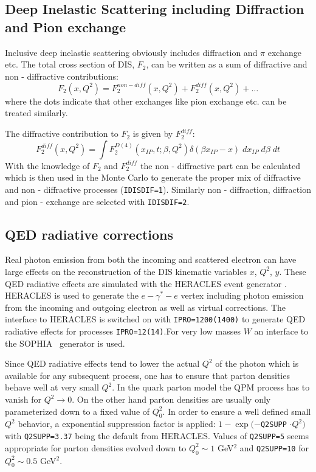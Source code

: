 \documentclass[10pt]{article} \usepackage{dina4}
\newcommand{\pom}{I\!\!P}
\newcommand{\xpom}{x_{\pom}}
\begin{document}
\subsection{Deep Inelastic Scattering including Diffraction and Pion exchange}
Inclusive deep inelastic scattering obviously includes diffraction and 
$\pi$ exchange etc. The total cross section of DIS, $F_2$, can be 
written as a sum of diffractive and non - diffractive contributions:
\begin{equation}
F_2(x,Q^2) = F_2^{non - diff}(x,Q^2) + F_2^{diff}(x,Q^2) + \ldots
\end{equation}
where the dots indicate that other exchanges like pion exchange etc. can
be treated similarly.
\par
The diffractive contribution to $F_2$ is given by $F_2^{diff}$:
\begin{equation}
F_2^{diff}(x,Q^2) =\int F_2^{D(4)}(\xpom,t;\beta,Q^2)
      \delta(\beta\xpom - x)\; d\xpom \;d\beta\;dt
\end{equation}
With the knowledge of $F_2$ and $F_2^{diff}$ the non - diffractive
part can be calculated which is then used in the Monte Carlo to generate the
proper mix of diffractive and non - diffractive processes 
(\verb+IDISDIF=1+). Similarly non - diffraction, diffraction and 
pion - exchange are selected with \verb+IDISDIF=2+.

\subsection{QED radiative corrections}

 Real photon emission from both the incoming and scattered electron
can have large effects on the reconstruction of the DIS kinematic 
variables $x$, $Q^2$, $y$. 
These QED radiative effects are simulated with
the HERACLES event generator \cite{HERACLESa,HERACLESb}. 
HERACLES is used to generate the $e -  \gamma^* - e$ vertex including
photon emission from the incoming and outgoing electron as well as 
virtual corrections. The interface to HERACLES is switched 
 on with \verb+IPRO=1200(1400)+ to generate QED radiative effects for 
 processes \verb+IPRO=12(14)+.For very low masses $W$ an interface to the
 SOPHIA~\cite{sophia} generator is used.
\par
Since QED radiative effects tend to lower the actual $Q^2$ of the 
photon which is available for any subsequent process, one has to
ensure that parton densities behave well at very small $Q^2$. 
In the quark parton model the QPM process has to
vanish for $Q^2 \rightarrow 0$. On the other hand parton densities
are usually only parameterized down to a fixed value of $Q_0^2$. In
order to ensure a well defined small $Q^2$ behavior, a exponential 
suppression factor is applied: $1 - \exp(-$\verb+Q2SUPP+ $\cdot Q^2)$ 
with \verb+Q2SUPP=3.37+ being the default from HERACLES.
Values of \verb+Q2SUPP=5+ seems appropriate for parton densities 
evolved down to $Q^2_0\sim 1$ GeV$^2$ and \verb+Q2SUPP=10+ for
$Q^2_0 \sim 0.5 $ GeV$^2$.
\end{document}
